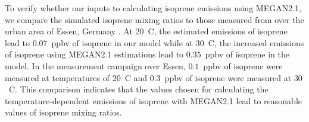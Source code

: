 To verify whether our inputs to calculating isoprene emissions using MEGAN2.1, we compare the simulated isoprene mixing ratios to those measured from over the urban area of Essen, Germany \citep{Wagner:2014}.
At $20$~\degree C, the estimated emissions of isoprene lead to $0.07$~ppbv of isoprene in our model while at $30$~\degree C, the increased emissions of isoprene using MEGAN2.1 estimations lead to $0.35$~ppbv of isoprene in the model.
In the measurement campaign over Essen, $0.1$~ppbv of isoprene were measured at temperatures of $20$~\degree C and $0.3$~ppbv of isoprene were measured at $30$~\degree C.
This comparison indicates that the values chosen for calculating the temperature-dependent emissions of isoprene with MEGAN2.1 lead to reasonable values of isoprene mixing ratios.
